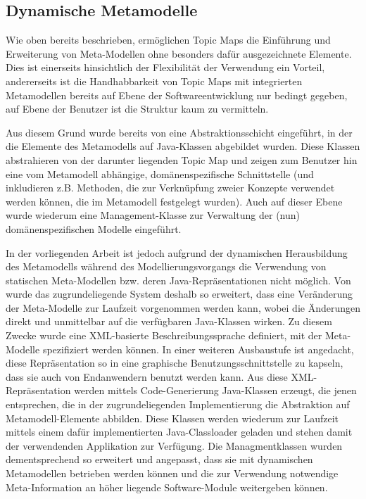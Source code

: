 \subsection{Dynamische Metamodelle}
\label{sec:dynamische_metamodelle}

Wie oben bereits beschrieben, ermöglichen Topic Maps die Einführung und Erweiterung von Meta-Modellen ohne besonders dafür ausgezeichnete Elemente. Dies ist einerseits hinsichtlich der Flexibilität der Verwendung ein Vorteil, andererseits ist die Handhabbarkeit von Topic Maps mit integrierten Metamodellen bereits auf Ebene der Softwareentwicklung nur bedingt gegeben, auf Ebene der Benutzer ist die Struktur kaum zu vermitteln.

Aus diesem Grund wurde bereits von \citep{Oppl07} eine Abstraktionsschicht eingeführt, in der die Elemente des Metamodells auf Java-Klassen abgebildet wurden. Diese Klassen abstrahieren von der darunter liegenden Topic Map und zeigen zum Benutzer hin eine vom Metamodell abhängige, domänenspezifische Schnittstelle (und inkludieren z.B. Methoden, die zur Verknüpfung zweier Konzepte verwendet werden können, die im Metamodell festgelegt wurden). Auch auf dieser Ebene wurde wiederum eine Management-Klasse zur Verwaltung der (nun) domänenspezifischen Modelle eingeführt.
 
In der vorliegenden Arbeit ist jedoch aufgrund der dynamischen Herausbildung des Metamodells während des Modellierungsvorgangs die Verwendung von statischen Meta-Modellen bzw. deren Java-Repräsentationen nicht möglich. Von \citet{Neubauer08} wurde das zugrundeliegende System deshalb so erweitert, dass eine Veränderung der Meta-Modelle zur Laufzeit vorgenommen werden kann, wobei die Änderungen direkt und unmittelbar auf die verfügbaren Java-Klassen wirken. Zu diesem Zwecke wurde eine \gls{XML}-basierte Beschreibungssprache definiert, mit der Meta-Modelle spezifiziert werden können. In einer weiteren Ausbaustufe ist angedacht, diese Repräsentation so in eine graphische Benutzungsschnittstelle zu kapseln, dass sie auch von Endanwendern benutzt werden kann. Aus diese \gls{XML}-Repräsentation werden mittels Code-Generierung Java-Klassen erzeugt, die jenen entsprechen, die in der zugrundeliegenden Implementierung die Abstraktion auf Metamodell-Elemente abbilden. Diese Klassen werden wiederum zur Laufzeit mittels einem dafür implementierten Java-Classloader geladen und stehen damit der verwendenden Applikation zur Verfügung. Die Managmentklassen wurden dementsprechend so erweitert und angepasst, dass sie mit dynamischen Metamodellen betrieben werden können und die zur Verwendung notwendige Meta-Information an höher liegende Software-Module weitergeben können.  

